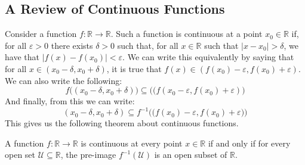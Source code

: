 \documentclass[crop=false,class=book,oneside]{standalone}
\begin{document}
        \subsection{A Review of Continuous Functions}
            Consider a function $f:\mathbb{R}\rightarrow\mathbb{R}$.
            Such a function is continuous at a point
            $x_{0}\in\mathbb{R}$ if, for all $\varepsilon>0$ there exists
            $\delta>0$ such that, for all $x\in\mathbb{R}$ such that
            $|x-x_{0}|>\delta$, we have that
            $|f(x)-f(x_{0})|<\varepsilon$. We can write this
            equivalently by saying that for all
            $x\in(x_{0}-\delta,x_{0}+\delta)$, it is true that
            $f(x)\in(f(x_{0})-\varepsilon,f(x_{0})+\varepsilon)$.
            We can also write the following:
            \begin{equation}
                f\Big((x_{0}-\delta,x_{0}+\delta)\Big)\subseteq
                \Big((f(x_{0}-\varepsilon,f(x_{0})+\varepsilon)\Big)
            \end{equation}
            And finally, from this we can write:
            \begin{equation}
                (x_{0}-\delta,x_{0}+\delta)\subseteq
                f^{-1}\Big(
                    \big(f(x_{0})-\varepsilon,f(x_{0})+\varepsilon\big)
                \Big)
            \end{equation}
            This gives us the following theorem about continuous
            functions.
            \begin{theorem}
                A function $f:\mathbb{R}\rightarrow\mathbb{R}$ is
                continuous at every point $x\in\mathbb{R}$ if and only
                if for every open set $\mathcal{U}\subseteq\mathbb{R}$,
                the pre-image $f^{-1}(\mathcal{U})$ is an open subset
                of $\mathbb{R}$.
            \end{theorem}
\end{document}
